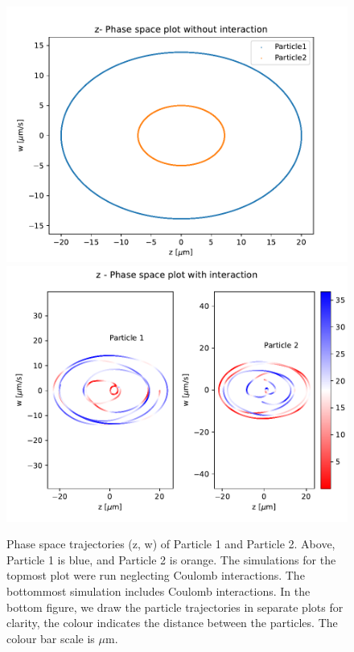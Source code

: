 \begin{figure}
\centering
\includegraphics[scale = 0.7]{../figures/z_phase_noint.pdf}
\includegraphics[scale = 0.7]{../figures/z_phase_int.pdf}
\caption{Phase space trajectories (z, w) of Particle 1 and Particle 2. Above, Particle 1 is blue, and Particle 2 is orange.
The simulations for the topmost plot were run neglecting Coulomb interactions. The bottommost simulation includes Coulomb interactions. In the bottom figure, we draw the particle trajectories in
separate plots for clarity, the colour indicates the distance between the particles. The colour bar scale is
$\mu$m.}
\label{fig:phase_z}
\end{figure}

